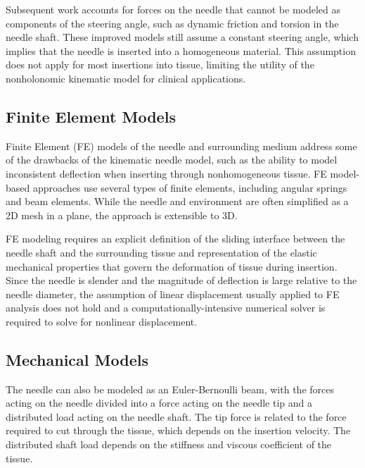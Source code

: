 Subsequent work accounts for forces on the needle that cannot be modeled as components of the steering angle, such as dynamic friction and torsion in the needle shaft\cite{reed_modeling_2009, swensen_torsional_2014}. These improved models still assume a constant steering angle, which implies that the needle is inserted into a homogeneous material. This assumption does not apply for most insertions into tissue, limiting the utility of the nonholonomic kinematic model for clinical applications.

\subsection{Finite Element Models}
Finite Element (FE) models of the needle and surrounding medium address some of the drawbacks of the kinematic needle model, such as the ability to model inconsistent deflection when inserting through nonhomogeneous tissue\cite{goksel_modeling_2009}. FE model-based approaches use several types of finite elements, including angular springs and beam elements. While the needle and environment are often simplified as a 2D mesh in a plane, the approach is extensible to 3D\cite{chentanez_interactive_2009}.

FE modeling requires an explicit definition of the sliding interface between the needle shaft and the surrounding tissue and representation of the elastic mechanical properties that govern the deformation of tissue during insertion\cite{dehghan_comparison_2006}. Since the needle is slender and the magnitude of deflection is large relative to the needle diameter, the assumption of linear displacement usually applied to FE analysis does not hold and a computationally-intensive numerical solver is required to solve for nonlinear displacement.


\subsection{Mechanical Models}
The needle can also be modeled as an Euler-Bernoulli beam, with the forces acting on the needle divided into a force acting on the needle tip and a distributed load acting on the needle shaft. The tip force is related to the force required to cut through the tissue, which depends on the insertion velocity\cite{barnett_fracture_2015}. The distributed shaft load depends on the stiffness and viscous coefficient of the tissue\cite{abayazid_integrating_2013}.

